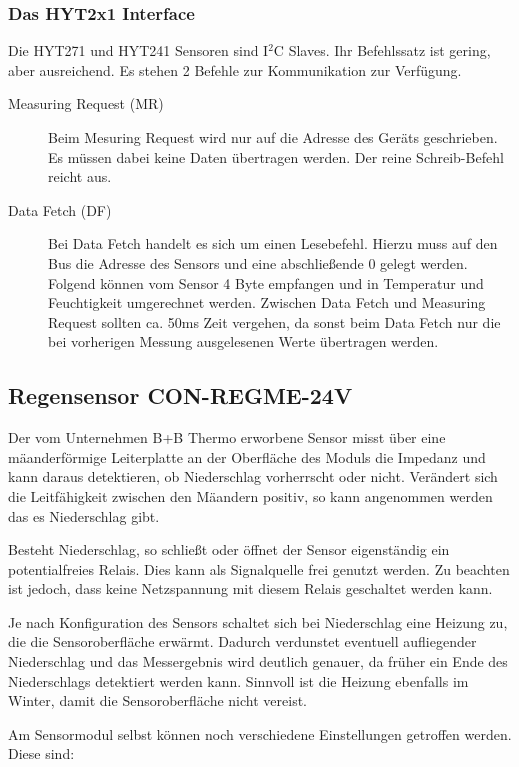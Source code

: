 			\subsubsection{Das HYT2x1 Interface}
				Die HYT271 und HYT241 Sensoren sind I$^{2}$C Slaves. Ihr Befehlssatz ist gering, aber ausreichend. Es stehen 2 Befehle zur Kommunikation zur Verfügung.
				
				\begin{description}
				\item[Measuring Request (MR)] Beim Mesuring Request wird nur auf die Adresse des Geräts geschrieben. Es müssen dabei keine Daten übertragen werden. Der reine Schreib-Befehl reicht aus.
				\item[Data Fetch (DF)] Bei Data Fetch handelt es sich um einen Lesebefehl. Hierzu muss auf den Bus die Adresse des Sensors und eine abschließende 0 gelegt werden. Folgend können vom Sensor 4 Byte empfangen und in Temperatur und Feuchtigkeit umgerechnet werden. Zwischen Data Fetch und Measuring Request sollten ca. 50ms Zeit vergehen, da sonst beim Data Fetch nur die bei vorherigen Messung ausgelesenen Werte übertragen werden.
				\end{description}
				
			\subsection{Regensensor CON-REGME-24V}
				Der vom Unternehmen B+B Thermo erworbene Sensor misst über eine mäanderförmige Leiterplatte an der Oberfläche des Moduls die Impedanz und kann daraus detektieren, ob Niederschlag vorherrscht oder nicht. Verändert sich die Leitfähigkeit zwischen den Mäandern positiv, so kann angenommen werden das es Niederschlag gibt.
				
				\newpage
				Besteht Niederschlag, so schließt oder öffnet der Sensor eigenständig ein potentialfreies Relais. Dies kann als Signalquelle frei genutzt werden. Zu beachten ist jedoch, dass keine Netzspannung mit diesem Relais geschaltet werden kann.
				
				Je nach Konfiguration des Sensors schaltet sich bei Niederschlag eine Heizung zu, die die Sensoroberfläche erwärmt. Dadurch verdunstet eventuell aufliegender Niederschlag und das Messergebnis wird deutlich genauer, da früher ein Ende des Niederschlags detektiert werden kann. Sinnvoll ist die Heizung ebenfalls im Winter, damit die Sensoroberfläche nicht vereist.
				
				Am Sensormodul selbst können noch verschiedene Einstellungen getroffen werden. Diese sind:
				
